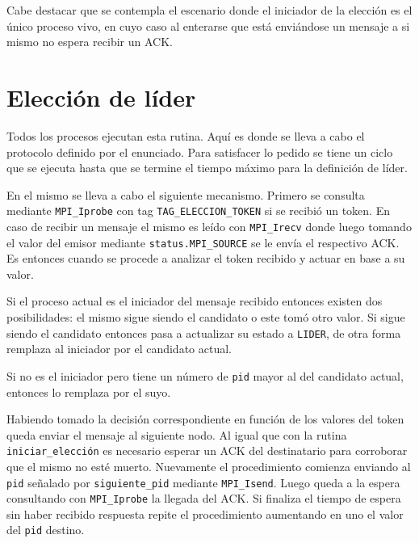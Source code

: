 \documentclass[a4paper]{article}
\begin{document}
Cabe destacar que se contempla el escenario donde el iniciador de la elección es
el único proceso vivo, en cuyo caso al enterarse que está enviándose un mensaje a
si mismo no espera recibir un \textsc{ACK}.

\section{Elección de líder}

Todos los procesos ejecutan esta rutina. Aquí es donde se lleva a cabo el
protocolo definido por el enunciado. Para satisfacer lo pedido se tiene un ciclo
que se ejecuta hasta que se termine el tiempo máximo para la definición de
líder.

En el mismo se lleva a cabo el siguiente mecanismo. Primero se consulta mediante
\texttt{MPI\_Iprobe} con tag \texttt{TAG\_ELECCION\_TOKEN} si se recibió
un token. En caso de recibir un mensaje el mismo es leído con \texttt{MPI\_Irecv} donde
luego tomando el valor del emisor mediante \texttt{status.MPI\_SOURCE} se le envía
el respectivo \textsc{ACK}. Es entonces cuando se procede a analizar el token
recibido y actuar en base a su valor.

Si el proceso actual es el iniciador del mensaje recibido entonces existen dos
posibilidades: el mismo sigue siendo el candidato o este tomó otro valor. Si
sigue siendo el candidato entonces pasa a actualizar su estado a \texttt{LIDER},
de otra forma remplaza al iniciador por el candidato actual.

Si no es el iniciador pero tiene un número de \texttt{pid} mayor al del
candidato actual, entonces lo remplaza por el suyo.

Habiendo tomado la decisión correspondiente en función de los valores del token
queda enviar el mensaje al siguiente nodo. Al igual que con la rutina
\texttt{iniciar\_elección} es necesario esperar un \textsc{ACK} del destinatario
para corroborar que el mismo no esté muerto. Nuevamente el procedimiento
comienza enviando al \texttt{pid} señalado por \texttt{siguiente\_pid} mediante
\texttt{MPI\_Isend}. Luego queda a la espera consultando con
\texttt{MPI\_Iprobe} la llegada del \textsc{ACK}. Si finaliza el tiempo de
espera sin haber recibido respuesta repite el procedimiento aumentando en uno el
valor del \texttt{pid} destino.
\end{document}
